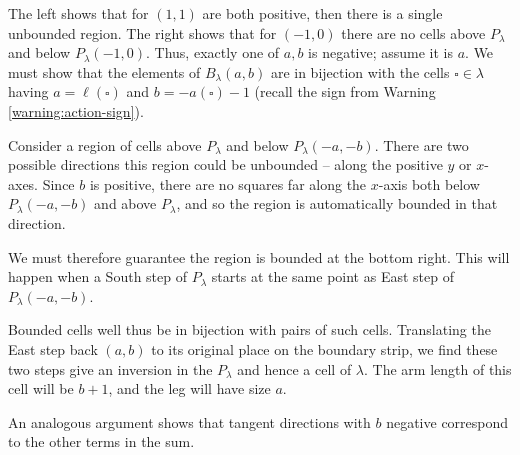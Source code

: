 \documentclass{amsart}[12pt]
\theoremstyle{definition}
\begin{document}
The left shows that for $(1,1)$ are both positive, then there is a single unbounded region.  The right shows that for $(-1,0)$ there are no cells above $P_\lambda$ and below $P_\lambda(-1,0)$.
Thus, exactly one of $a,b$ is negative; assume it is $a$.  We must show that the elements of $B_\lambda(a,b)$ are in bijection with the cells $\square\in\lambda$ having  $a=\ell(\square)$ and $b=-a(\square)-1$ (recall the sign from Warning \ref{warning:action-sign}).

Consider a region of cells above $P_\lambda$ and below $P_\lambda(-a,-b)$.  There are two possible directions this region could be unbounded -- along the positive $y$ or $x$-axes.  Since $b$ is positive, there are no squares far along the $x$-axis both below $P_\lambda(-a,-b)$  and above $P_\lambda$, and so the region is automatically bounded in that direction.  

We must therefore guarantee the region is bounded at the bottom right.  This will happen when a South step of $P_\lambda$ starts at the same point as East step of $P_\lambda(-a,-b)$.  




Bounded cells well thus be in bijection with pairs of such cells.  Translating the East step back $(a,b)$ to its original place on the boundary strip, we find these two steps give an inversion in the $P_\lambda$ and hence a cell of $\lambda$.  The arm length of this cell will be $b+1$, and the leg will have size $a$. 

An analogous argument shows that tangent directions with $b$ negative correspond to the other terms in the sum.








\end{document}
